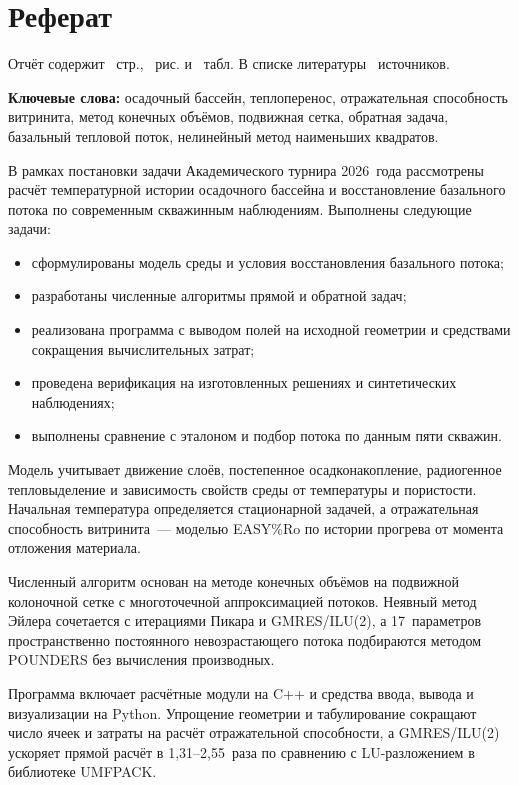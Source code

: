 \section*{Реферат}

Отчёт содержит \ztotpages~стр., ~рис. и ~табл. В списке литературы ~источников.

\noindent\textbf{Ключевые слова:} осадочный бассейн, теплоперенос, отражательная способность витринита, метод конечных объёмов, подвижная сетка, обратная задача, базальный тепловой поток, нелинейный метод наименьших квадратов.

В рамках постановки задачи Академического турнира 2026~года рассмотрены расчёт температурной истории осадочного бассейна и восстановление базального потока по современным скважинным наблюдениям. Выполнены следующие задачи:
\begin{itemize}
\item сформулированы модель среды и условия восстановления базального потока;
\item разработаны численные алгоритмы прямой и обратной задач;
\item реализована программа с выводом полей на исходной геометрии и средствами сокращения вычислительных затрат;
\item проведена верификация на изготовленных решениях и синтетических наблюдениях;
\item выполнены сравнение с эталоном и подбор потока по данным пяти скважин.
\end{itemize}

Модель учитывает движение слоёв, постепенное осадконакопление, радиогенное тепловыделение и зависимость свойств среды от температуры и пористости. Начальная температура определяется стационарной задачей, а отражательная способность витринита~--- моделью EASY\%Ro по истории прогрева от момента отложения материала.

Численный алгоритм основан на методе конечных объёмов на подвижной колоночной сетке с многоточечной аппроксимацией потоков. Неявный метод Эйлера сочетается с итерациями Пикара и GMRES/ILU(2), а 17~параметров пространственно постоянного невозрастающего потока подбираются методом POUNDERS без вычисления производных.

Программа включает расчётные модули на C++ и средства ввода, вывода и визуализации на Python. Упрощение геометрии и табулирование сокращают число ячеек и затраты на расчёт отражательной способности, а GMRES/ILU(2) ускоряет прямой расчёт в 1,31--2,55~раза по сравнению с LU-разложением в библиотеке UMFPACK.

